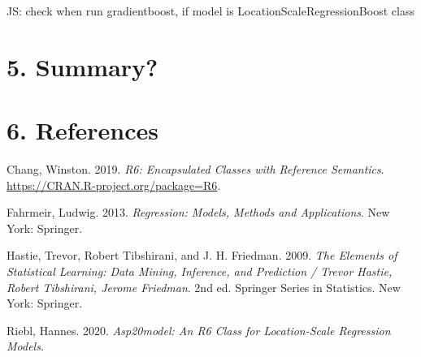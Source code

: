 \documentclass[
]{report}
\begin{document}
JS: check when run gradientboost, if model is
LocationScaleRegressionBoost class

\hypertarget{summary}{%
\chapter{5. Summary?}\label{summary}}

\hypertarget{references}{%
\chapter*{6. References}\label{references}}

\hypertarget{refs}{}
\leavevmode\hypertarget{ref-R-R6}{}%
Chang, Winston. 2019. \emph{R6: Encapsulated Classes with Reference
Semantics}. \url{https://CRAN.R-project.org/package=R6}.

\leavevmode\hypertarget{ref-Fahrmeir.2013}{}%
Fahrmeir, Ludwig. 2013. \emph{Regression: Models, Methods and
Applications}. New York: Springer.

\leavevmode\hypertarget{ref-Hastie.2009}{}%
Hastie, Trevor, Robert Tibshirani, and J. H. Friedman. 2009. \emph{The
Elements of Statistical Learning: Data Mining, Inference, and Prediction
/ Trevor Hastie, Robert Tibshirani, Jerome Friedman}. 2nd ed. Springer
Series in Statistics. New York: Springer.

\leavevmode\hypertarget{ref-R-asp20model}{}%
Riebl, Hannes. 2020. \emph{Asp20model: An R6 Class for Location-Scale
Regression Models}.
\end{document}
